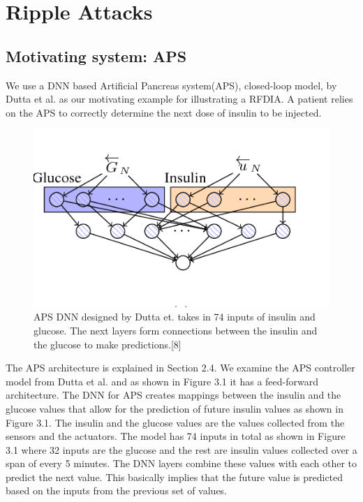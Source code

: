 \chapter{Ripple Attacks}
\label{ch:Chapter2}

\section{Motivating system: APS}


We use a DNN based Artificial Pancreas system(APS), closed-loop model, by Dutta et al. \cite{10.1007/978-3-319-99429-1_11}  as our motivating example for illustrating a \ac{RFDIA}. 
A patient relies on  the APS to correctly determine the next dose of insulin to be injected. 

\begin{figure}
	\centering
	\includegraphics[width=0.7\linewidth, height=0.3\linewidth]{Images/APSDNN}
	\caption[APS DNN]{APS DNN designed by Dutta et. takes in 74 inputs of insulin and glucose. The next layers form connections between the insulin and the glucose to make predictions.[8]}
	\label{fig:apsdnn}
\end{figure}

The APS architecture is explained in Section 2.4. 
We examine the \ac{APS} controller model from Dutta et al. and as shown in Figure 3.1 it has a feed-forward architecture. 
The DNN for APS creates mappings between the insulin and the glucose values that allow for the prediction of future insulin values as shown in Figure 3.1. 
The insulin and the glucose values are the values collected from the sensors and the actuators. 
The model has 74 inputs in total as shown in Figure 3.1 where 32 inputs are the glucose and the rest are insulin values collected over a span of every 5 minutes. The DNN layers combine these values with each other to predict the next value. This basically implies that the future value is predicted based on the inputs from the previous set of values. 


